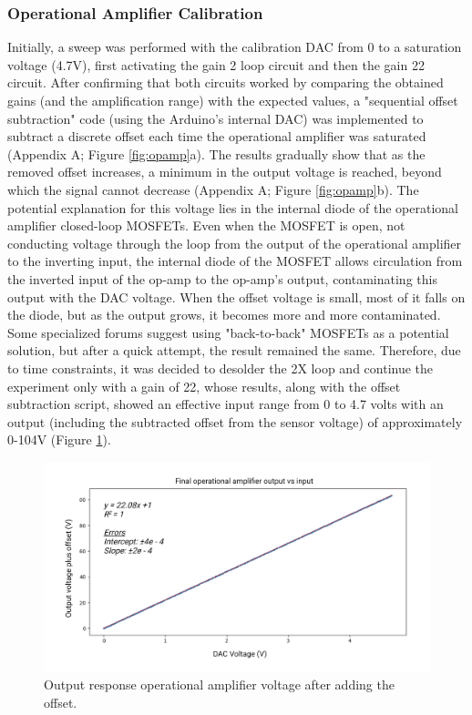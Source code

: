 \documentclass[conference]{IEEEtran}
\begin{document}
      \subsubsection{Operational Amplifier Calibration}
      Initially, a sweep was performed with the calibration DAC from 0 to a saturation voltage (4.7V), first activating the gain 2 loop circuit and then the gain 22 circuit.
       After confirming that both circuits worked by comparing the obtained gains (and the amplification range) with the expected values, a "sequential offset subtraction" code 
       (using the Arduino's internal DAC) was implemented to subtract a discrete offset each time the operational amplifier was saturated (Appendix A; Figure \ref{fig:opamp}a). The results gradually show that as the 
       removed offset increases, a minimum in the output voltage is reached, beyond which the signal cannot decrease (Appendix A; Figure \ref{fig:opamp}b). The potential explanation for this voltage lies in the internal
        diode of the operational amplifier closed-loop MOSFETs. Even when the MOSFET is open, not conducting voltage through the loop from the output of the operational amplifier 
        to the inverting input, the internal diode of the MOSFET allows circulation from the inverted input of the op-amp to the op-amp's output, contaminating this output with the DAC voltage. 
        When the offset voltage is small, most of it falls on the diode, but as the output grows, it becomes more and more contaminated. Some specialized forums suggest using "back-to-back" MOSFETs\cite{BackBackMOSFET} 
        as a potential solution, but after a quick attempt, the result remained the same. Therefore, due to time constraints, it was decided to desolder the 2X loop and continue the experiment only with a 
        gain of 22, whose results, along with the offset subtraction script, showed an effective input range from 0 to 4.7 volts with an output (including the subtracted offset from the sensor voltage) 
        of approximately 0-104V (Figure \ref{fig:finalop}).

        \begin{figure}[!th]
         \centering
         \includegraphics[width=1\linewidth]{images/finalop.png}
         \caption{Output response operational amplifier voltage after adding the offset.}
         \label{fig:finalop}
      \end{figure}
\end{document}
